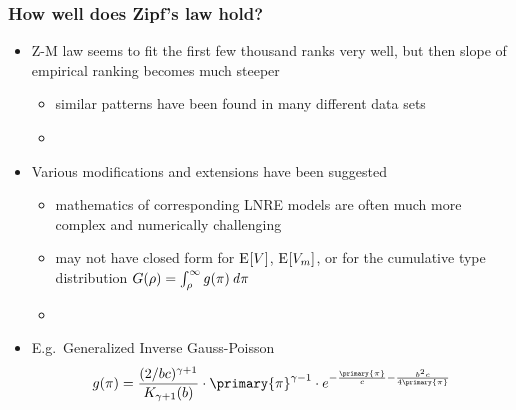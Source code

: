 \documentclass[t]{beamer} %
\begin{document}
\begin{frame}
  \frametitle{How well does Zipf's law hold?}

  \begin{itemize}
  \item Z-M law seems to fit the first few thousand ranks very well, but then slope of empirical ranking becomes much steeper
    \begin{itemize}
    \item similar patterns have been found in many different data sets
    \item[]
    \end{itemize}
  \item<2-> Various modifications and extensions have been suggested \citep{Sichel:71,Kornai:99,Montemurro:01}
    \begin{itemize}
    \item mathematics of corresponding LNRE models are often much more complex and numerically challenging
    \item may not have closed form for $\mathrm{E}_{}[V]$, $\mathrm{E}_{}[V_m]$, or for the cumulative type distribution $G(\rho) = \int_{\rho}^{\infty} g(\pi) \,\mathit{d{\pi}}$
    \item[]
    \end{itemize}
  \item<3-> E.g.\ Generalized Inverse Gauss-Poisson \citep[GIGP;][]{Sichel:71}
    \[
      g(\pi) =
      \frac{(2 / bc)^{\gamma + 1}}{K_{\gamma+1}(b)} \cdot
      \primary{\pi}^{\gamma-1} \cdot
      e^{-\frac{\primary{\pi}}{c} - \frac{b^2 c}{4 \primary{\pi}}}
    \]
  \end{itemize}
\end{frame}
\end{document}
